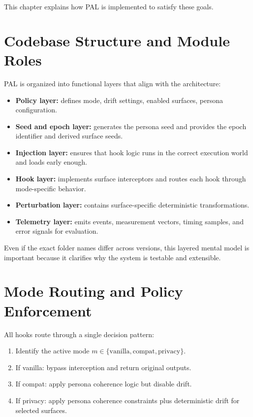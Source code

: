 \documentclass[11pt]{report}
\begin{document}
This chapter explains how PAL is implemented to satisfy these goals.

\section{Codebase Structure and Module Roles}

PAL is organized into functional layers that align with the architecture:

\begin{itemize}
    \item \textbf{Policy layer:} defines mode, drift settings, enabled surfaces, persona configuration.
    \item \textbf{Seed and epoch layer:} generates the persona seed and provides the epoch identifier and derived surface seeds.
    \item \textbf{Injection layer:} ensures that hook logic runs in the correct execution world and loads early enough.
    \item \textbf{Hook layer:} implements surface interceptors and routes each hook through mode-specific behavior.
    \item \textbf{Perturbation layer:} contains surface-specific deterministic transformations.
    \item \textbf{Telemetry layer:} emits events, measurement vectors, timing samples, and error signals for evaluation.
\end{itemize}

Even if the exact folder names differ across versions, this layered mental model is important because it clarifies why the system is testable and extensible.

\section{Mode Routing and Policy Enforcement}

All hooks route through a single decision pattern:

\begin{enumerate}
    \item Identify the active mode $m \in \{\text{vanilla},\text{compat},\text{privacy}\}$.
    \item If vanilla: bypass interception and return original outputs.
    \item If compat: apply persona coherence logic but disable drift.
    \item If privacy: apply persona coherence constraints plus deterministic drift for selected surfaces.
\end{enumerate}
\end{document}
